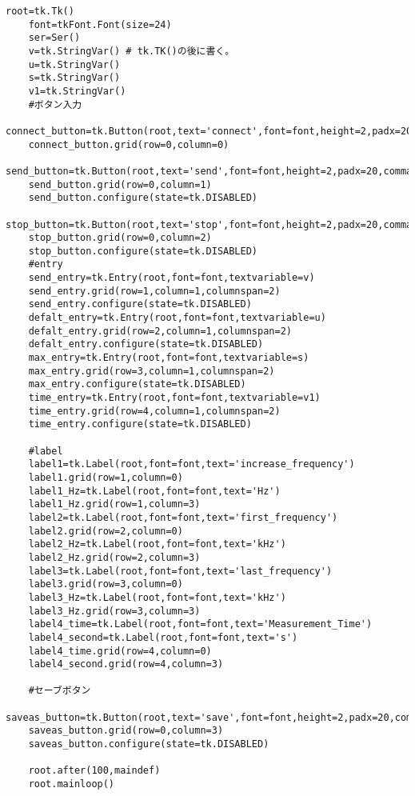 \documentclass[12pt]{jarticle}
\begin{document}
\begin{lstlisting}[caption = GUIプログラム , label = program1]
	root=tk.Tk()
	font=tkFont.Font(size=24)
	ser=Ser() 
	v=tk.StringVar() # tk.TK()の後に書く。
	u=tk.StringVar()
	s=tk.StringVar()
	v1=tk.StringVar()
	#ボタン入力
	connect_button=tk.Button(root,text='connect',font=font,height=2,padx=20,command=ser.connect)
	connect_button.grid(row=0,column=0)
	send_button=tk.Button(root,text='send',font=font,height=2,padx=20,command=ser.send_com)
	send_button.grid(row=0,column=1)
	send_button.configure(state=tk.DISABLED)
	stop_button=tk.Button(root,text='stop',font=font,height=2,padx=20,command=ser.stop_com)
	stop_button.grid(row=0,column=2)
	stop_button.configure(state=tk.DISABLED)
	#entry
	send_entry=tk.Entry(root,font=font,textvariable=v)
	send_entry.grid(row=1,column=1,columnspan=2)
	send_entry.configure(state=tk.DISABLED)
	defalt_entry=tk.Entry(root,font=font,textvariable=u)
	defalt_entry.grid(row=2,column=1,columnspan=2)
	defalt_entry.configure(state=tk.DISABLED)
	max_entry=tk.Entry(root,font=font,textvariable=s)
	max_entry.grid(row=3,column=1,columnspan=2)
	max_entry.configure(state=tk.DISABLED)
	time_entry=tk.Entry(root,font=font,textvariable=v1)
	time_entry.grid(row=4,column=1,columnspan=2)
	time_entry.configure(state=tk.DISABLED)
	
	#label
	label1=tk.Label(root,font=font,text='increase_frequency')
	label1.grid(row=1,column=0)
	label1_Hz=tk.Label(root,font=font,text='Hz')
	label1_Hz.grid(row=1,column=3)
	label2=tk.Label(root,font=font,text='first_frequency')
	label2.grid(row=2,column=0)
	label2_Hz=tk.Label(root,font=font,text='kHz')
	label2_Hz.grid(row=2,column=3)
	label3=tk.Label(root,font=font,text='last_frequency')
	label3.grid(row=3,column=0)
	label3_Hz=tk.Label(root,font=font,text='kHz')
	label3_Hz.grid(row=3,column=3)
	label4_time=tk.Label(root,font=font,text='Measurement_Time')
	label4_second=tk.Label(root,font=font,text='s')
	label4_time.grid(row=4,column=0)
	label4_second.grid(row=4,column=3)
	
	#セーブボタン
	saveas_button=tk.Button(root,text='save',font=font,height=2,padx=20,command=saveas)
	saveas_button.grid(row=0,column=3)
	saveas_button.configure(state=tk.DISABLED)
	
	root.after(100,maindef)
	root.mainloop()   
	
	
	\end{lstlisting}
\end{document}
